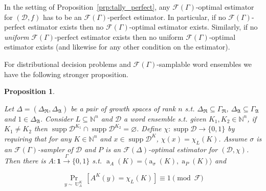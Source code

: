 \documentclass{article}
\numberwithin{equation}{section}
\theoremstyle{definition}
\theoremstyle{plain}
\newtheorem{proposition}{Proposition}[section]
\newcommand{\Bool}{\{0,1\}}
\DeclareMathOperator{\Supp}{supp}
\DeclareMathOperator{\Prb}{Pr}
\DeclareMathOperator{\A}{a}
\DeclareMathOperator{\Un}{U}
\newcommand{\Nats}{\mathbb{N}}
\newcommand{\Chev}[1]{\langle #1 \rangle}
\newcommand{\Dist}{\mathcal{D}}
\newcommand{\GrowR}{\Gamma_{\mathfrak{R}}}
\newcommand{\GrowA}{\Gamma_{\mathfrak{A}}}
\newcommand{\Fall}{\mathcal{F}}
\newcommand{\EG}{\Fall(\Gamma)}
\newcommand{\Scheme}{\xrightarrow{\Gamma}}
\begin{document}
In the setting of Proposition~\ref{prp:tally_perfect}, any ${\EG}$-optimal estimator for ${(\Dist,f)}$ has to be an ${\EG}$-perfect estimator. In particular, if no ${\EG}$-perfect estimator exists then no ${\EG}$-optimal estimator exists. Similarly, if no \emph{uniform} ${\EG}$-perfect estimator exists then no uniform ${\EG}$-optimal estimator exists (and likewise for any other condition on the estimator).

For distributional decision problems and ${\EG}$-samplable word ensembles we have the following stronger proposition.

\begin{samepage}
\begin{proposition}
\label{prp:tally_smp_bpp}

Let ${\Delta=(\Delta_{\mathfrak{R}}, \Delta_{\mathfrak{A}})}$ be a pair of growth spaces of rank ${n}$ s.t. ${\Delta_{\mathfrak{R}} \subseteq \GrowR}$, ${\Delta_{\mathfrak{A}} \subseteq \GrowA}$ and ${1 \in \Delta_{\mathfrak{A}}}$. Consider ${L \subseteq \Nats^n}$ and ${\Dist}$ a word ensemble s.t. given ${K_1, K_2 \in \Nats^n}$, if ${K_1 \ne K_2}$ then ${\Supp \Dist^{K_1} \cap \Supp \Dist^{K_2} = \varnothing}$. Define ${\chi: \Supp \Dist \rightarrow \Bool}$ by requiring that for any ${K \in \Nats^n}$ and $x \in \Supp \Dist^K$, ${\chi(x)=\chi_L(K)}$. Assume ${\sigma}$ is an ${\EG}$-sampler of ${\Dist}$ and ${P}$ is an ${\Fall(\Delta)}$-optimal estimator for ${(\Dist, \chi)}$. Then there is ${A: \bm{1} \Scheme \Bool}$ s.t. ${\A_A(K)=\Chev{\A_\sigma(K),\A_P(K)}}$ and

\begin{equation}
\Prb_{y \sim \Un_A^K}[A^K(y)=\chi_L(K)] \equiv 1 \pmod \Fall
\end{equation}

\end{proposition}
\end{samepage}
\end{document}
